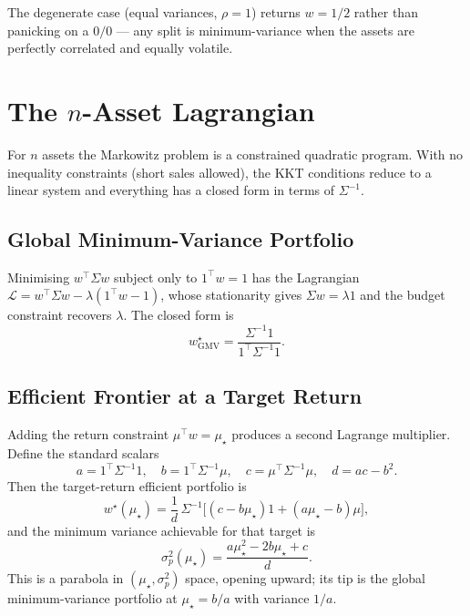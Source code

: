 The degenerate case (equal variances, $\rho = 1$) returns $w = 1/2$ rather
than panicking on a $0/0$ --- any split is minimum-variance when the assets
are perfectly correlated and equally volatile.

\section{The $n$-Asset Lagrangian}


For $n$ assets the Markowitz problem is a constrained quadratic program.
With no inequality constraints (short sales allowed), the KKT conditions
reduce to a linear system and everything has a closed form in terms of
$\Sigma^{-1}$.

\subsection{Global Minimum-Variance Portfolio}

Minimising $w^\top \Sigma w$ subject only to $1^\top w = 1$ has the
Lagrangian $\mathcal{L} = w^\top \Sigma w - \lambda (1^\top w - 1)$, whose
stationarity gives $\Sigma w = \lambda 1$ and the budget constraint
recovers $\lambda$. The closed form is
\[
w^\star_{\text{GMV}} = \frac{\Sigma^{-1} 1}{1^\top \Sigma^{-1} 1}.
\]

\subsection{Efficient Frontier at a Target Return}

Adding the return constraint $\mu^\top w = \mu_\star$ produces a second
Lagrange multiplier. Define the standard scalars
\[
a = 1^\top \Sigma^{-1} 1, \quad
b = 1^\top \Sigma^{-1} \mu, \quad
c = \mu^\top \Sigma^{-1} \mu, \quad
d = a c - b^2.
\]
Then the target-return efficient portfolio is
\[
w^\star(\mu_\star) = \frac{1}{d} \, \Sigma^{-1}
\bigl[ (c - b \mu_\star) 1 + (a \mu_\star - b) \mu \bigr],
\]
and the minimum variance achievable for that target is
\[
\sigma_p^2(\mu_\star) = \frac{a \mu_\star^2 - 2 b \mu_\star + c}{d}.
\]
This is a parabola in $(\mu_\star, \sigma_p^2)$ space, opening upward; its
tip is the global minimum-variance portfolio at $\mu_\star = b/a$ with
variance $1/a$.

